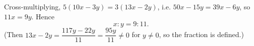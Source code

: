 Cross-multiplying, $5(10x-3y)=3(13x-2y)$, i.e. $50x-15y=39x-6y$, so $11x=9y$. Hence
\[x:y=\boxed{9:11}.\]
(Then $13x-2y=\dfrac{117y-22y}{11}=\dfrac{95y}{11}\ne0$ for $y\ne0$, so the fraction is defined.)
